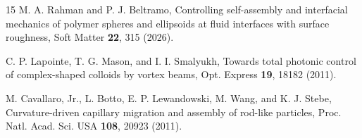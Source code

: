 \documentclass[aps,prl,reprint,superscriptaddress,nofootinbib,floatfix]{revtex4-2}
\begin{document}
\begin{thebibliography}{15}
M. A. Rahman and P. J. Beltramo,
Controlling self-assembly and interfacial mechanics of polymer spheres and ellipsoids at fluid interfaces with surface roughness,
Soft Matter \textbf{22}, 315 (2026).

C. P. Lapointe, T. G. Mason, and I. I. Smalyukh,
Towards total photonic control of complex-shaped colloids by vortex beams,
Opt. Express \textbf{19}, 18182 (2011).

M. Cavallaro, Jr., L. Botto, E. P. Lewandowski, M. Wang, and K. J. Stebe,
Curvature-driven capillary migration and assembly of rod-like particles,
Proc. Natl. Acad. Sci. USA \textbf{108}, 20923 (2011).

\end{thebibliography}
\end{document}
